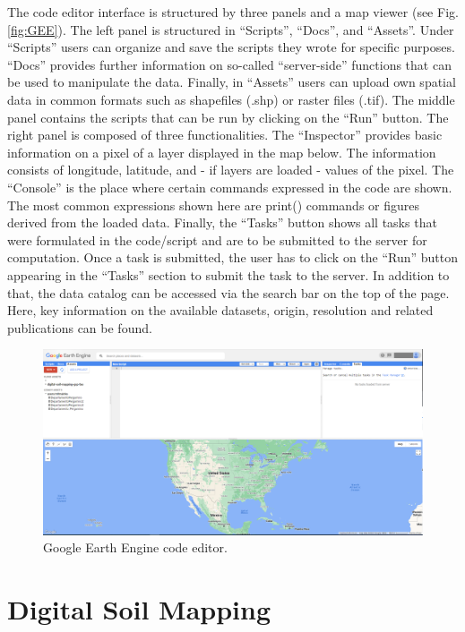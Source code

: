 \documentclass[
  10pt,
  b5paper,
  oneside]{book}
\begin{document}
The code editor interface is structured by three panels and a map viewer (see Fig. \ref{fig:GEE}). The left panel is structured in ``Scripts'', ``Docs'', and ``Assets''. Under ``Scripts'' users can organize and save the scripts they wrote for specific purposes. ``Docs'' provides further information on so-called ``server-side'' functions that can be used to manipulate the data. Finally, in ``Assets'' users can upload own spatial data in common formats such as shapefiles (.shp) or raster files (.tif).
The middle panel contains the scripts that can be run by clicking on the ``Run'' button.
The right panel is composed of three functionalities. The ``Inspector'' provides basic information on a pixel of a layer displayed in the map below. The information consists of longitude, latitude, and - if layers are loaded - values of the pixel. The ``Console'' is the place where certain commands expressed in the code are shown. The most common expressions shown here are print() commands or figures derived from the loaded data. Finally, the ``Tasks'' button shows all tasks that were formulated in the code/script and are to be submitted to the server for computation. Once a task is submitted, the user has to click on the ``Run'' button appearing in the ``Tasks'' section to submit the task to the server.
In addition to that, the data catalog can be accessed via the search bar on the top of the page. Here, key information on the available datasets, origin, resolution and related publications can be found.

\begin{figure}
\includegraphics[width=26.69in]{images/2.1_GEE_codeeditor} \caption{Google Earth Engine code editor.}\label{fig:GEE2}
\end{figure}

\hypertarget{digital-soil-mapping}{%
\chapter{Digital Soil Mapping}\label{digital-soil-mapping}}
\end{document}
